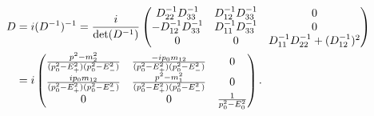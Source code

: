\begin{align}
    \notag
    D & = i (D^{-1})^{-1} = \frac{i}{\det(D^{-1})}
    \begin{pmatrix}
        D^{-1}_{22} D^{-1}_{33}   & D^{-1}_{12}D^{-1}_{33}  & 0 \\
        -D^{-1}_{12}D^{-1}_{33}   & D^{-1}_{11}D^{-1}_{33}  & 0 \\
        0               & 0             & D^{-1}_{11}D^{-1}_{22} + (D^{-1}_{12})^2
    \end{pmatrix} \\
    \label{free pion propagator}
    & = i
    \begin{pmatrix}
        \frac{
            p^2 - m_2^2
        }
        {
            (p_0^2 - E_+^2)(p_0^2 - E_-^2)
        } 
        & \frac{
            - ip_0m_{12}
        }
        {
            (p_0^2 - E_+^2)(p_0^2 - E_-^2)
        } & 0 \\
        \frac{
            ip_0m_{12}
        }
        {
            (p_0^2 - E_+^2)(p_0^2 - E_-^2)
        }
        & \frac{
            p^2 - m_1^2
        }
        {
            (p_0^2 - E_+^2)(p_0^2 - E_-^2)
        } & 0 \\
        0 & 0 & 
        \frac{1}{p_0^2 - E_0^2}
    \end{pmatrix}.
\end{align}
